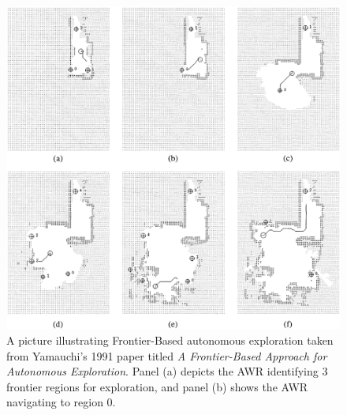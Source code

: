 \documentclass[a4paper]{article}
\begin{document}
\begin{figure}[h]
\centering
\includegraphics[scale=0.5]{frontier_exploration}
\caption{A picture illustrating Frontier-Based autonomous exploration taken from Yamauchi's 1991 paper titled \textit{A Frontier-Based Approach for Autonomous Exploration}. Panel (a) depicts the AWR identifying 3 frontier regions for exploration, and panel (b) shows the AWR navigating to region 0. }
\end{figure}

\clearpage
\end{document}
